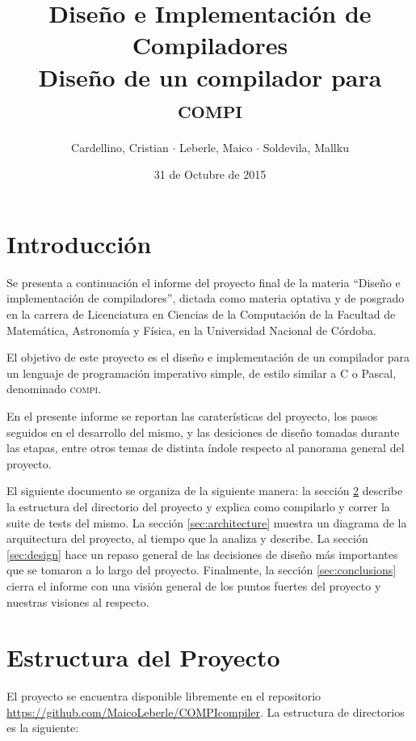 \documentclass[12pt, a4paper, titlepage]{article}
\title{
  \large{Diseño e Implementación de Compiladores}\\
  \huge{Diseño de un compilador para \textsc{compi}}
}
\author{
  Cardellino, Cristian $\cdot$ Leberle, Maico $\cdot$ Soldevila, Mallku
}
\date{31 de Octubre de 2015}
\begin{document}
  \maketitle

  \section{Introducción}

  Se presenta a continuación el informe del proyecto final de la materia
  ``Diseño e implementación de compiladores'', dictada como materia optativa y
  de posgrado en la carrera de Licenciatura en Ciencias de la Computación de la
  Facultad de Matemática, Astronomía y Física, en la Universidad Nacional de
  Córdoba.

  El objetivo de este proyecto es el diseño e implementación de un compilador
  para un lenguaje de programación imperativo simple, de estilo similar a C o
  Pascal, denominado \textsc{compi}.

  En el presente informe se reportan las caraterísticas del proyecto, los pasos
  seguidos en el desarrollo del mismo, y las desiciones de diseño tomadas
  durante las etapas, entre otros temas de distinta índole respecto al panorama
  general del proyecto.

  El siguiente documento se organiza de la siguiente manera: la sección
  \ref{sec:struct} describe la estructura del directorio del proyecto y explica
  como compilarlo y correr la suite de tests del mismo. La sección
  \ref{sec:architecture} muestra un diagrama de la arquitectura del proyecto, al
  tiempo que la analiza y describe. La sección \ref{sec:design} hace un repaso
  general de las decisiones de diseño más importantes que se tomaron a lo largo
  del proyecto. Finalmente, la sección \ref{sec:conclusions} cierra el informe
  con una visión general de los puntos fuertes del proyecto y nuestras visiones
  al respecto.

  \section{Estructura del Proyecto}\label{sec:struct}

  El proyecto se encuentra disponible libremente en el repositorio
  \url{https://github.com/MaicoLeberle/COMPIcompiler}. La estructura de
  directorios es la siguiente:

\end{document}

